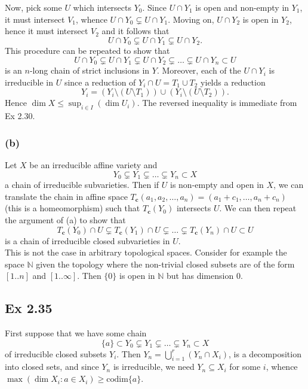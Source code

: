 \documentclass{article}
\theoremstyle{definition}
\newcommand{\N}{\mathbb{N}}
\newcommand{\codim}{\text{codim}}
\begin{document}
Now, pick some $U$ which intersects $Y_0$. Since $U \cap Y_1$ is open and
non-empty in $Y_1$, it must intersect $V_1$, whence $U \cap Y_0 \subsetneq
U \cap Y_1$. Moving on, $U \cap Y_2$ is open in $Y_2$, hence it must
intersect $V_2$ and it follows that 
\[
	U \cap Y_0 \subsetneq U \cap Y_1 \subsetneq U \cap Y_2.
\] 
This procedure can be repeated to show that 
\[
	U \cap Y_0 \subsetneq U \cap Y_1 \subsetneq U \cap Y_2 \subsetneq
	\ldots \subsetneq U \cap Y_n \subset U
\] 
is an $n$-long chain of strict inclusions in $Y$. Moreover, each of the $U
\cap Y_i$ is irreducible in $U$ since a reduction of $Y_i \cap U = T_1 \cup
T_2$ yields a reduction
\[
	Y_i 
	= 
	(Y_i \setminus (U \setminus T_1))
	\cup
	(Y_i \setminus (U \setminus T_2)).
\]
Hence $\dim X \leq \sup_{i \in I}(\dim U_i)$. The reversed inequality
is immediate from Ex 2.30.

\subsubsection*{(b)} 

Let $X$ be an irreducible affine variety and 
\[
Y_0 \subsetneq Y_1 \subsetneq \ldots \subsetneq Y_n \subset X
\] 
a chain of irreducible subvarieties. Then if $U$ is non-empty and open in $X$,
we can translate the chain in affine space $T_{\bm{c}}(a_1, a_2, \ldots, a_n) =
(a_1 + c_1, \ldots, a_n + c_n)$ (this is a homeomorphism) such that
$T_{\bm{c}}(Y_0)$ intersects $U$. We can then repeat the argument of (a) to
show that 
\[
	T_{\bm{c}}(Y_0) \cap U \subsetneq T_{\bm{c}}(Y_1) \cap U \subsetneq \ldots
	\subsetneq T_{\bm{c}}(Y_n) \cap U \subset U
\] 
is a chain of irreducible closed subvarieties in $U$. \\

This is not the case in arbitrary topological spaces. Consider for example the
space $\N$ given the topology where the non-trivial closed subsets are of the
form $[1..n]$ and $[1..\infty]$. Then $\{0\}$ is open in $\N$ but has dimension
$0$. \\



\subsection*{Ex 2.35} 

First suppose that we have some chain
\[
	\{a\} \subset Y_0 \subsetneq Y_1 \subsetneq \ldots \subsetneq Y_n \subset X
\] 
of irreducible closed subsets $Y_i$. Then $Y_n = \bigcup_{i=1}^{r} \left(Y_n
\cap X_i\right)$, is a decomposition into closed sets, and since $Y_n$ is
irreducible, we need $Y_n \subseteq X_i$ for some $i$, whence $\max(\dim X_i :
a \in X_i) \geq \codim \{a\}$. \\
\end{document}
